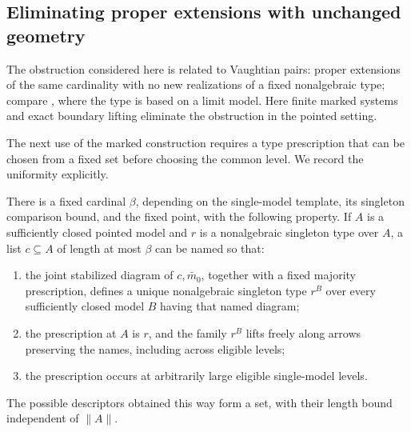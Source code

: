 \subsection{Eliminating proper extensions with unchanged geometry}

The obstruction considered here is related to Vaughtian pairs: proper
extensions of the same cardinality with no new realizations of a fixed
nonalgebraic type; compare \cite{GrossbergVanDieren2006}, where the type
is based on a limit model.  Here finite marked systems and exact boundary
lifting eliminate the obstruction in the pointed setting.

The next use of the marked construction requires a type prescription
that can be chosen from a fixed set before choosing the common level.
We record the uniformity explicitly.

\begin{lemma}
\label{geom:anchored-type}
\label{geom:root-prescription}
There is a fixed cardinal $\beta$, depending on the single-model
template, its singleton comparison bound, and the fixed point, with
the following property.  If $A$ is a sufficiently closed pointed
model and $r$ is a nonalgebraic singleton type over $A$, a list
$c\subseteq A$ of length at most $\beta$ can be named so that:
\begin{enumerate}
\item the joint stabilized diagram of $c,\bar m_0$, together with a
      fixed majority prescription, defines a unique nonalgebraic
      singleton type $r^B$ over every sufficiently closed model $B$
      having that named diagram;
\item the prescription at $A$ is $r$, and the family $r^B$ lifts
      freely along arrows preserving the names, including across
      eligible levels;
\item the prescription occurs at arbitrarily large eligible
      single-model levels.
\end{enumerate}
The possible descriptors obtained this way form a set, with their
length bound independent of $\|A\|$.
\end{lemma}

